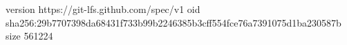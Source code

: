 version https://git-lfs.github.com/spec/v1
oid sha256:29b7707398da68431f733b99b2246385b3cff554fce76a7391075d1ba230587b
size 561224
